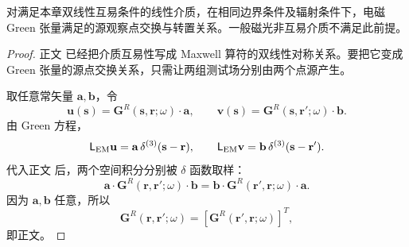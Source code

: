 \begin{theorem}
对满足本章双线性互易条件的线性介质，在相同边界条件及辐射条件下，电磁 Green 张量满足的源观察点交换与转置关系。一般磁光非互易介质不满足此前提。
\end{theorem}
\begin{proof}
正文 已经把介质互易性写成 Maxwell 算符的双线性对称关系。要把它变成 Green 张量的源点交换关系，只需让两组测试场分别由两个点源产生。

取任意常矢量 \(\mathbf a,\mathbf b\)，令
\begin{equation*}
\mathbf u(\mathbf s)=\mathbf G^R(\mathbf s,\mathbf r;\omega)\cdot\mathbf a,
\qquad
\mathbf v(\mathbf s)=\mathbf G^R(\mathbf s,\mathbf r';\omega)\cdot\mathbf b.
\end{equation*}
由 Green 方程，
\begin{equation*}
\mathsf L_{\rm EM}\mathbf u
=\mathbf a\,\delta^{(3)}(\mathbf s-\mathbf r),
\qquad
\mathsf L_{\rm EM}\mathbf v
=\mathbf b\,\delta^{(3)}(\mathbf s-\mathbf r').
\end{equation*}
代入正文 后，两个空间积分分别被 \(\delta\) 函数取样：
\begin{equation*}
\mathbf a\cdot\mathbf G^R(\mathbf r,\mathbf r';\omega)\cdot\mathbf b
=\mathbf b\cdot\mathbf G^R(\mathbf r',\mathbf r;\omega)\cdot\mathbf a.
\end{equation*}
因为 \(\mathbf a,\mathbf b\) 任意，所以
\begin{equation*}
\mathbf G^R(\mathbf r,\mathbf r';\omega)
=[\mathbf G^R(\mathbf r',\mathbf r;\omega)]^T,
\end{equation*}
即正文。
\end{proof}

